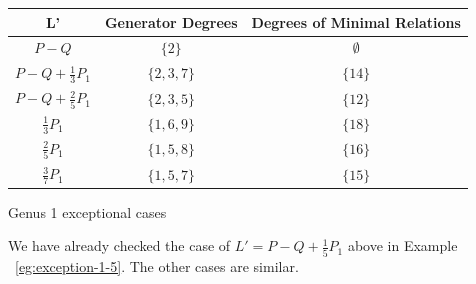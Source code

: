 \documentclass{amsart}
\theoremstyle{plain}
\theoremstyle{definition}
\theoremstyle{remark}
\newtheorem{rem}[thm]{Remark}
\numberwithin{equation}{section}
\begin{document}
\begin{longtable}	{| c || c | c |}
	\hline
	L' & Generator Degrees & Degrees of Minimal Relations \\
	\hline
	\hline
	$P - Q$ & $\{2\}$ & $\emptyset$ \\	\hline

	$P - Q + \frac{1}{3}P_1$ & $\{2,3,7\}$ & $\{14\}$ \\	\hline

	$P - Q + \frac{2}{5}P_1$ & $\{2,3,5\}$ & $\{12\}$ \\	\hline
	
	$\frac{1}{3}P_1$ & $\{1,6,9\}$ & $\{18\}$ \\	\hline

	$\frac{2}{5}P_1$ & $\{1,5,8\}$ & $\{16\}$ \\	\hline
	
	$\frac{3}{7}P_1$ & $\{1,5,7\}$ & $\{15\}$ \\	\hline
	
	
\end{longtable}

\begin{center}
\label{table:g-1-exceptional}
Genus 1 exceptional cases
\end{center}



We have already checked the case of 
$L' = P - Q + \frac{1}{5}P_1$ above in Example ~\ref{eg:exception-1-5}. The other cases are similar.
\end{document}
